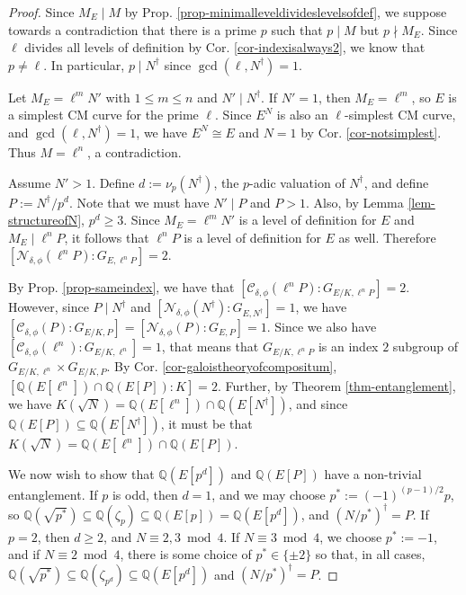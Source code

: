 \documentclass[11pt]{amsart}
\theoremstyle{definition}
\newcommand{\Q}{\mathbb{Q}}
\begin{document}
\begin{proof}

    Since $M_E \mid M$ by Prop. \ref{prop-minimalleveldivideslevelsofdef}, we suppose towards a contradiction that there is a prime $p$ such that $p \mid M$ but $p \nmid M_E$. Since $\ell$ divides all levels of definition by Cor. \ref{cor-indexisalways2}, we know that $p \neq \ell$. In particular, $p \mid N^{\dagger}$ since $\gcd(\ell, N^{\dagger}) = 1$.
    
    Let $M_E = \ell^m N'$ with $1 \leq m \leq n$ and $N' \mid N^{\dagger}$. If $N' = 1$, then $M_E = \ell^m$, so $E$ is a simplest CM curve for the prime $\ell$. Since $E^N$ is also an $\ell$-simplest CM curve, and $\gcd(\ell, N^{\dagger}) = 1$, we have $E^N \cong E$ and $N = 1$ by Cor. \ref{cor-notsimplest}. Thus $M = \ell^n$, a contradiction.

    Assume $N' > 1$. Define $d := \nu_{p}(N^{\dagger})$, the $p$-adic valuation of $N^{\dagger}$, and define $P := N^{\dagger}/p^d$. Note that we must have $N' \mid P$ and $P > 1$. Also, by Lemma \ref{lem-structureofN}, $p^d \geq 3$. Since $M_E = \ell^m N'$ is a level of definition for $E$ and $M_E \mid \ell^n P$, it follows that $\ell^n P$ is a level of definition for $E$ as well. Therefore $[\mathcal{N}_{\delta, \phi}(\ell^n P) : G_{E, \ell^n P}] = 2$.
    
    By Prop. \ref{prop-sameindex}, we have that $[\mathcal{C}_{\delta, \phi}(\ell^n P) : G_{E/K, \ell^n P}] = 2$. However, since $P \mid N^{\dagger}$ and $[\mathcal{N}_{\delta, \phi}(N^{\dagger}) : G_{E, N^{\dagger}}] = 1$, we have $[\mathcal{C}_{\delta, \phi}(P) : G_{E/K, P}] = [\mathcal{N}_{\delta, \phi}(P) : G_{E, P}] = 1$. Since we also have $[\mathcal{C}_{\delta, \phi}(\ell^n) : G_{E/K, \ell^n}] = 1$, that means that $G_{E/K, \ell^n P}$ is an index $2$ subgroup of $G_{E/K, \ell^n} \times G_{E/K, P}$. By Cor. \ref{cor-galoistheoryofcompositum}, $[\Q(E[\ell^n]) \cap \Q(E[P]) : K] = 2$. Further, by Theorem \ref{thm-entanglement}, we have $K(\sqrt{N}) = \Q(E[\ell^n]) \cap \Q(E[N^{\dagger}])$, and since $\Q(E[P]) \subseteq \Q(E[N^{\dagger}])$, it must be that $K(\sqrt{N}) = \Q(E[\ell^n]) \cap \Q(E[P])$.

    
    We now wish to show that $\Q(E[p^d])$ and $\Q(E[P])$ have a non-trivial entanglement. If $p$ is odd, then $d = 1$, and we may choose $p^{\ast} := (-1)^{(p-1)/2} p$, so $\Q(\sqrt{p^{\ast}}) \subseteq \Q(\zeta_{p}) \subseteq \Q(E[p]) = \Q(E[p^d])$, and $(N/p^{\ast})^{\dagger} = P$. If $p = 2$, then $d \geq 2$, and $N \equiv 2, 3 \bmod 4$. If $N \equiv 3 \bmod 4$, we choose $p^{\ast} := -1$, and if $N \equiv 2 \bmod 4$,  there is some choice of $p^{\ast} \in \{\pm 2\}$ so that, in all cases, $\Q(\sqrt{p^{\ast}}) \subseteq \Q(\zeta_{p^d}) \subseteq \Q(E[p^d])$ and $(N/p^{\ast})^{\dagger} = P$.


\end{proof}
\end{document}
